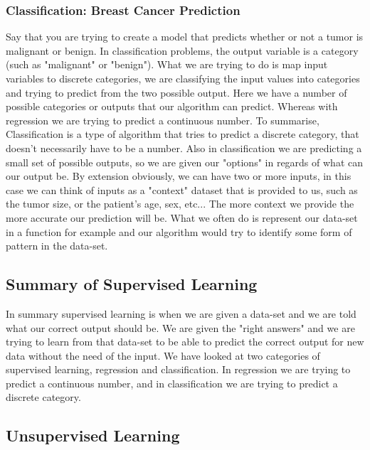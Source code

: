 \subsubsection*{Classification: Breast Cancer Prediction}
Say that you are trying to create a model that predicts whether or not a tumor is malignant or benign. In classification problems, the output variable is a category (such as "malignant" or "benign"). What we are trying to do is map input variables to discrete categories, we are classifying the input values into categories and trying to predict from the two possible output. Here we have a number of possible categories or outputs that our algorithm can predict. Whereas with regression we are trying to predict a continuous number. 
To summarise, Classification is a type of algorithm that tries to predict a discrete category, that doesn't necessarily have to be a number. Also in classification we are predicting a small set of possible outputs, so we are given our "options" in regards of what can our output be.
By extension obviously, we can have two or more inputs, in this case we can think of inputs as a "context" dataset that is provided to us, such as the tumor size, or the patient's age, sex, etc... The more context we provide the more accurate our prediction will be.
What we often do is represent our data-set in a function for example and our algorithm would try to identify some form of pattern in the data-set.

\subsection{Summary of Supervised Learning}
In summary supervised learning is when we are given a data-set and we are told what our correct output should be. We are given the "right answers" and we are trying to learn from that data-set to be able to predict the correct output for new data without the need of the input.
We have looked at two categories of supervised learning, regression and classification. In regression we are trying to predict a continuous number, and in classification we are trying to predict a discrete category.


\subsection{Unsupervised Learning}

